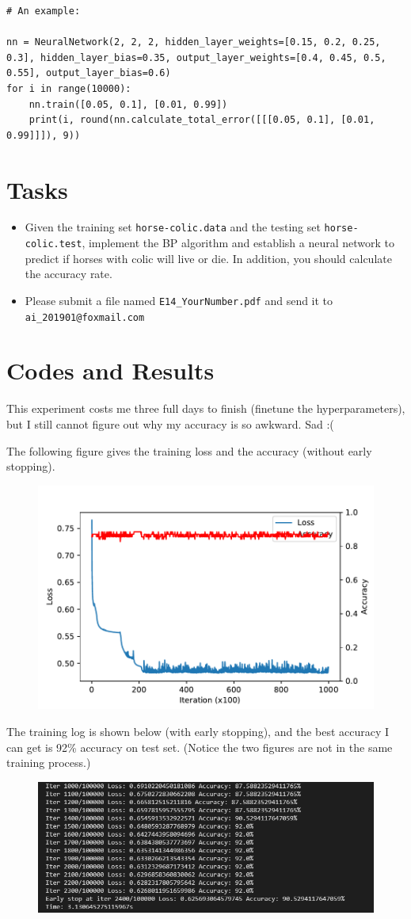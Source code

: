 \documentclass[a4paper, 11pt]{article}
\begin{document}
\begin{enumerate}
\begin{lstlisting}
# An example:

nn = NeuralNetwork(2, 2, 2, hidden_layer_weights=[0.15, 0.2, 0.25, 0.3], hidden_layer_bias=0.35, output_layer_weights=[0.4, 0.45, 0.5, 0.55], output_layer_bias=0.6)
for i in range(10000):
    nn.train([0.05, 0.1], [0.01, 0.99])
    print(i, round(nn.calculate_total_error([[[0.05, 0.1], [0.01, 0.99]]]), 9))
\end{lstlisting}

\end{enumerate}
\section{Tasks}
\begin{itemize}
	\item Given the training set \texttt{horse-colic.data} and the testing set \texttt{horse-colic.test}, implement the BP algorithm and establish a neural network to predict if horses with colic will live or die. In addition, you should calculate the accuracy rate.
	\item Please submit a file named \texttt{E14\_YourNumber.pdf} and send it to \texttt{ai\_201901@foxmail.com}
\end{itemize}

\section{Codes and Results}
This experiment costs me three full days to finish (finetune the hyperparameters), but I still cannot figure out why my accuracy is so awkward. Sad :(

The following figure gives the training loss and the accuracy (without early stopping).
\begin{figure}[H]
\centering
\includegraphics[width=0.6\linewidth]{fig/iteration.pdf}
\end{figure}

The training log is shown below (with early stopping), and the best accuracy I can get is 92\% accuracy on test set. (Notice the two figures are not in the same training process.)
\begin{figure}[H]
\centering
\includegraphics[width=0.8\linewidth]{fig/log.png}
\end{figure}
\end{document}
